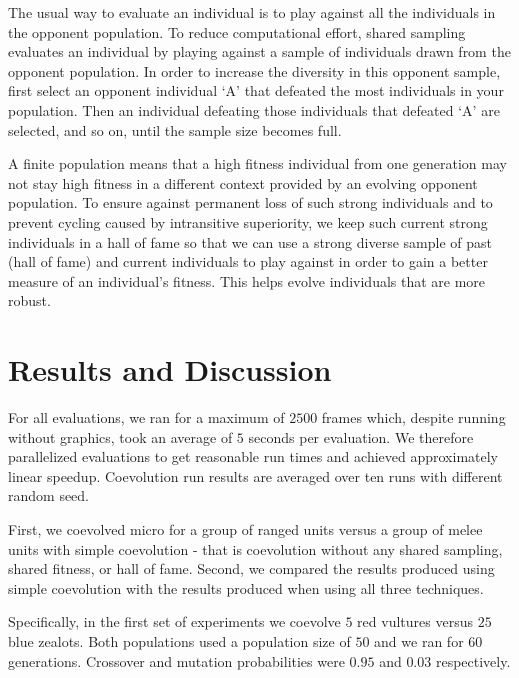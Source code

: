 \documentclass[conference,10pt]{IEEEtran}
\begin{document}
The usual way to evaluate an individual is to play against all the
individuals in the opponent population. To reduce computational
effort, shared sampling evaluates an individual by playing against a
sample of individuals drawn from the opponent population. In order to
increase the diversity in this opponent sample, first select an
opponent individual ‘A’ that defeated the most individuals in your
population. Then an individual defeating those individuals that
defeated ‘A’ are selected, and so on, until the sample size becomes
full.

A finite population means that a high fitness individual from one
generation may not stay high fitness in a different context provided
by an evolving opponent population. To ensure against permanent loss
of such strong individuals and to prevent cycling caused by
intransitive superiority, we keep such current strong
individuals in a hall of fame so that we can use a strong diverse
sample of past (hall of fame) and current individuals to play against
in order to gain a better measure of an individual’s fitness. This
helps evolve individuals that are more robust.

\section{Results and Discussion}
\label{SectionResultsDiscussion}
%

For all evaluations, we ran for a maximum of $2500$ frames which,
despite running without graphics, took an average of $5$ seconds per
evaluation. We therefore parallelized evaluations to get reasonable
run times and achieved approximately linear speedup. Coevolution run results are
averaged over ten runs with different random seed.

First, we coevolved micro for a group of ranged units versus a group
of melee units with simple coevolution - that is coevolution without
any shared sampling, shared fitness, or hall of fame.  Second, we
compared the results produced using simple coevolution with the
results produced when using all three techniques. 

Specifically, in the first set of experiments we coevolve $5$ red
vultures versus $25$ blue zealots. Both populations used a population
size of $50$ and we ran for $60$ generations. Crossover and mutation
probabilities were $0.95$ and $0.03$ respectively.
\end{document}
